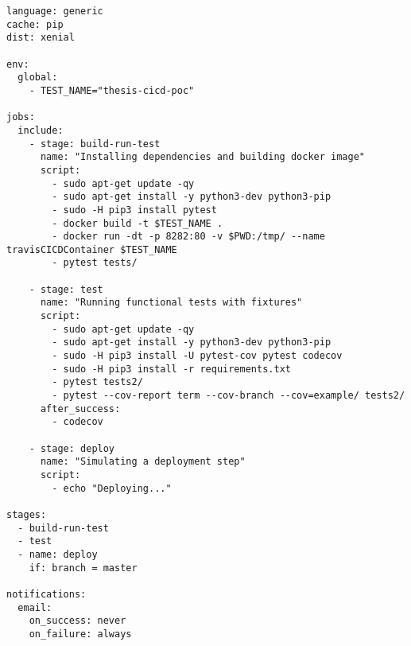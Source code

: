 \begin{lstlisting}[frame=single, basicstyle=\tiny]
language: generic
cache: pip
dist: xenial

env:
  global:
    - TEST_NAME="thesis-cicd-poc"

jobs:
  include:
    - stage: build-run-test
      name: "Installing dependencies and building docker image"
      script:
        - sudo apt-get update -qy
        - sudo apt-get install -y python3-dev python3-pip
        - sudo -H pip3 install pytest
        - docker build -t $TEST_NAME .
        - docker run -dt -p 8282:80 -v $PWD:/tmp/ --name travisCICDContainer $TEST_NAME
        - pytest tests/

    - stage: test
      name: "Running functional tests with fixtures"
      script:
        - sudo apt-get update -qy
        - sudo apt-get install -y python3-dev python3-pip
        - sudo -H pip3 install -U pytest-cov pytest codecov
        - sudo -H pip3 install -r requirements.txt
        - pytest tests2/
        - pytest --cov-report term --cov-branch --cov=example/ tests2/
      after_success:
        - codecov

    - stage: deploy
      name: "Simulating a deployment step"
      script:
        - echo "Deploying..."

stages:
  - build-run-test
  - test
  - name: deploy
    if: branch = master

notifications:
  email:
    on_success: never
    on_failure: always
\end{lstlisting}
